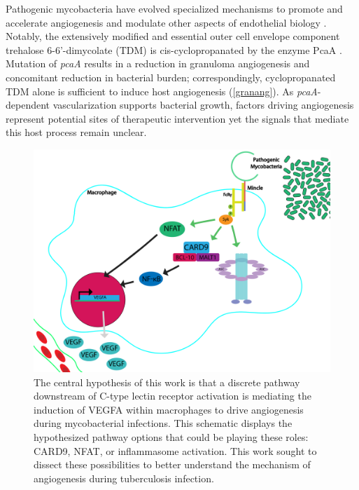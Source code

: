 Pathogenic mycobacteria have evolved specialized mechanisms to promote and accelerate angiogenesis and modulate other aspects of endothelial biology \citep{Oehlers2017}. Notably, the extensively modified and essential outer cell envelope component trehalose 6\hyp{}6'\hyp{}dimycolate (TDM) is cis\hyp{}cyclopropanated by the enzyme PcaA \citep{Glickman2000, Rao2005}. Mutation of \textit{pcaA} results in a reduction in granuloma angiogenesis and concomitant reduction in bacterial burden; correspondingly, cyclopropanated TDM alone is sufficient to induce host angiogenesis \citep{Saita2000, Sakaguchi2000, Walton2018} (\autoref{granang}). As \textit{pcaA}\hyp{}dependent vascularization supports bacterial growth, factors driving angiogenesis represent potential sites of therapeutic intervention yet the signals that mediate this host process remain unclear.

\begin{figure}
\centering
\includegraphics[width=\textwidth]{images/intro_schematic.pdf}
\caption[Schematic of the possible pathways downstream of C-type lectin activation]{The central hypothesis of this work is that a discrete pathway downstream of C\hyp{}type lectin receptor activation is mediating the induction of VEGFA within macrophages to drive angiogenesis during mycobacterial infections. This schematic displays the hypothesized pathway options that could be playing these roles: CARD9, NFAT, or inflammasome activation. This work sought to dissect these possibilities to better understand the mechanism of angiogenesis during tuberculosis infection.}
\label{figure:beginschematic}
\end{figure}

